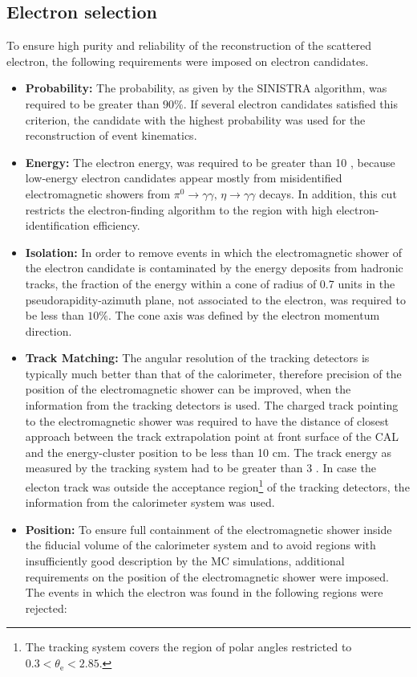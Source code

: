 \subsection{Electron selection}
\label{subsec:eleselect}

To ensure high purity and reliability of the reconstruction of the scattered electron, the following requirements were imposed on electron candidates.
\begin{itemize}
	\item \textbf{Probability:} The probability, as given by the SINISTRA algorithm, was required to be greater than $90\%$. If several electron candidates satisfied this criterion, the candidate with the highest probability was used for the reconstruction of event kinematics.
	\item \textbf{Energy:} The electron energy, \eefin was required to be greater than 10 \GeV, because low-energy electron candidates appear mostly from misidentified electromagnetic showers from $\pi^0\rightarrow\gamma\gamma,\, \eta\rightarrow\gamma\gamma$ decays. In addition, this cut restricts the electron-finding algorithm to the region with high electron-identification efficiency.
	\item \textbf{Isolation:} In order to remove events in which the electromagnetic shower of the electron candidate is contaminated by the energy deposits from hadronic tracks, the fraction of the energy within a cone of radius of 0.7 units in the pseudorapidity-azimuth plane, not associated to the electron, was required to be less than $10\%$. The cone axis was defined by the electron momentum direction.
	\item \textbf{Track Matching:} The angular resolution of the tracking detectors is typically much better than that of the calorimeter, therefore precision of the position of the electromagnetic shower can be improved, when the information from the tracking detectors is used. The charged track pointing to the electromagnetic shower was required to have the distance of closest approach between the track extrapolation point at front surface of the CAL and the energy-cluster position to be less than 10 cm. The track energy as measured by the tracking system had to be greater than 3 \GeV. In case the electon track was outside the acceptance region\footnote{The tracking system covers the region of polar angles restricted to $0.3 < \theta_\text{e} < 2.85$. } of the tracking detectors, the information from the calorimeter system was used.
	\item \textbf{Position:} To ensure full containment of the electromagnetic shower inside the fiducial volume of the calorimeter system and to avoid regions with insufficiently good description by the MC simulations, additional requirements on the position of the electromagnetic shower were imposed. The events in which the electron was found in the following regions were rejected:

\end{itemize}
